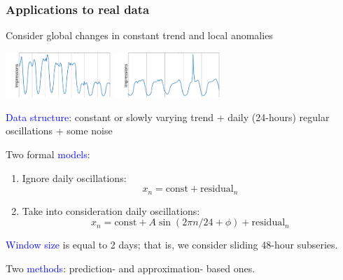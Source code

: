 \documentclass[intlimits, 9pt, unicode]{beamer}
\newcommand{\textblue}[1]{\textcolor{blue}{#1}}
\begin{document}
\begin{frame}
    \frametitle{Applications to real data}
    
    Consider global changes in constant trend and local anomalies

\medskip    
    \includegraphics[width = 4cm]{images/cp_mean}\qquad
    \includegraphics[width = 4cm]{images/cp_outlier}

\medskip
\textblue{Data structure}: constant or slowly varying trend + daily (24-hours) regular oscillations + some noise

\medskip
Two formal \textblue{models}:

\medskip
\begin{enumerate}
\item
Ignore daily oscillations:
$$ x_n = \mathrm{const} + \mathrm{residual}_n $$
\item
Take into consideration daily oscillations:
$$ x_n = \mathrm{const} + A\sin(2\pi n/24+\phi) + \mathrm{residual}_n $$
\end{enumerate}

\medskip
\textblue{Window size} is equal to 2 days; that is, we consider sliding 48-hour subseries.

\medskip
Two \textblue{methods}: prediction- and approximation- based ones.

 \end{frame}
\end{document}
